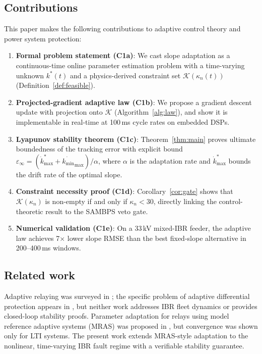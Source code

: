 \documentclass[journal]{IEEEtran}
\newcommand{\kappan}{\kappa_{n}}
\newcommand{\kstar}{k^*}
\newcommand{\kmin}{k_{\min}}
\newcommand{\calK}{\mathcal{K}}
\begin{document}
\subsection{Contributions}

This paper makes the following contributions to adaptive control theory
and power system protection:

\begin{enumerate}
  \item \textbf{Formal problem statement (C1a)}: We cast slope adaptation
        as a continuous-time online parameter estimation problem with a
        time-varying unknown $\kstar(t)$ and a physics-derived constraint
        set $\calK(\kappan(t))$ (Definition~\ref{def:feasible}).

  \item \textbf{Projected-gradient adaptive law (C1b)}: We propose a
        gradient descent update with projection onto $\calK$
        (Algorithm~\ref{alg:law}), and show it is implementable in
        real-time at 100\,ms cycle rates on embedded DSPs.

  \item \textbf{Lyapunov stability theorem (C1c)}: Theorem~\ref{thm:main}
        proves ultimate boundedness of the tracking error with explicit
        bound $\varepsilon_\infty = (\dot{k}^*_{\max} + \dot{\kmin}_{\max})/\alpha$,
        where $\alpha$ is the adaptation rate and $\dot{k}^*_{\max}$
        bounds the drift rate of the optimal slope.

  \item \textbf{Constraint necessity proof (C1d)}: Corollary~\ref{cor:gate}
        shows that $\calK(\kappan)$ is non-empty if and only if
        $\kappan < 30$, directly linking the control-theoretic result to
        the SAMBPS veto gate.

  \item \textbf{Numerical validation (C1e)}: On a 33\,kV mixed-IBR
        feeder, the adaptive law achieves 7$\times$ lower slope RMSE
        than the best fixed-slope alternative in 200--400\,ms windows.
\end{enumerate}

\subsection{Related work}

Adaptive relaying was surveyed in \cite{Perez2014adaptive};
the specific problem of adaptive differential protection appears in
\cite{Kasztenny2010diff,Sachdev1985}, but neither work addresses
IBR fleet dynamics or provides closed-loop stability proofs.
Parameter adaptation for relays using model reference adaptive systems
(MRAS) was proposed in \cite{Phadke1988}, but convergence was shown only
for LTI systems.  The present work extends MRAS-style adaptation to the
nonlinear, time-varying IBR fault regime with a verifiable stability
guarantee.
\end{document}
